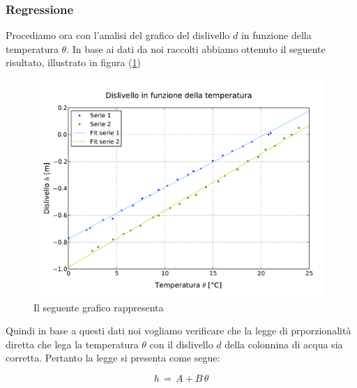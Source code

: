 \subsubsection{Regressione}

Procediamo ora con l'analisi del grafico del dislivello $d$ in funzione della temperatura $\theta$. In base ai dati da noi raccolti abbiamo ottenuto il seguente risultato, illustrato in figura (\ref{fig:dislivello_temperatura})

\begin{figure}
    \centering
    \includegraphics[width=110mm]{immagini/dislivello_temperatura.pdf}
    \caption{Il seguente grafico rappresenta}
    \label{fig:dislivello_temperatura}
\end{figure}
%
Quindi in base a questi dati noi vogliamo verificare che la legge di prporzionalità diretta che lega la temperatura $\theta$ con il dislivello $d$ della colonnina di acqua sia corretta. Pertanto la legge si presenta come segue:

\begin{equation}
	h \,=\, A + B\,\theta
	\label{h_theta}
\end{equation}
%
